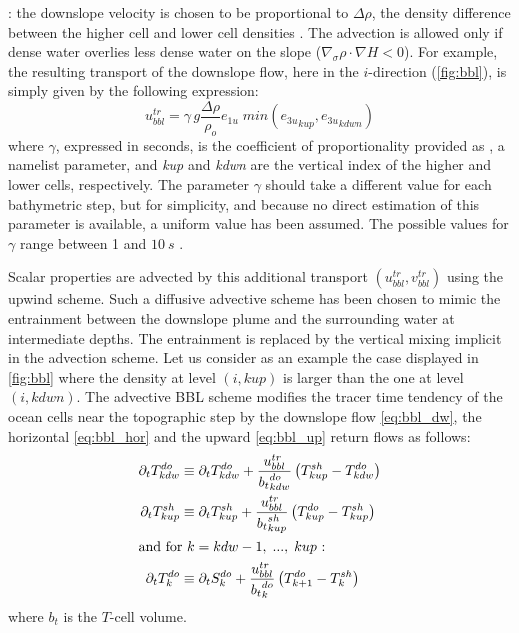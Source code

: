 \documentclass[../main/NEMO_manual]{subfiles}
\begin{document}
:
the downslope velocity is chosen to be proportional to $\Delta \rho$,
the density difference between the higher cell and lower cell densities \citep{Campin_Goosse_Tel99}.
The advection is allowed only  if dense water overlies less dense water on the slope
(\ie $\nabla_\sigma \rho  \cdot  \nabla H<0$).
For example, the resulting transport of the downslope flow, here in the $i$-direction (\autoref{fig:bbl}),
is simply given by the following expression:
\[
  u^{tr}_{bbl} = \gamma \, g \frac{\Delta \rho}{\rho_o}  e_{1u} \; min \left( {e_{3u}}_{kup},{e_{3u}}_{kdwn} \right)
\]
where $\gamma$, expressed in seconds, is the coefficient of proportionality provided as ,
a namelist parameter, and \textit{kup} and \textit{kdwn} are the vertical index of the higher and lower cells,
respectively.
The parameter $\gamma$ should take a different value for each bathymetric step, but for simplicity,
and because no direct estimation of this parameter is available, a uniform value has been assumed.
The possible values for $\gamma$ range between 1 and $10~s$ \citep{Campin_Goosse_Tel99}.

Scalar properties are advected by this additional transport $( u^{tr}_{bbl}, v^{tr}_{bbl} )$ using the upwind scheme.
Such a diffusive advective scheme has been chosen to mimic the entrainment between the downslope plume and
the surrounding water at intermediate depths.
The entrainment is replaced by the vertical mixing implicit in the advection scheme.
Let us consider as an example the case displayed in \autoref{fig:bbl} where
the density at level $(i,kup)$ is larger than the one at level $(i,kdwn)$.
The advective BBL scheme modifies the tracer time tendency of the ocean cells near the topographic step by
the downslope flow \autoref{eq:bbl_dw}, the horizontal \autoref{eq:bbl_hor} and
the upward \autoref{eq:bbl_up} return flows as follows: 
\begin{align}
  \partial_t T^{do}_{kdw} &\equiv \partial_t T^{do}_{kdw}
                            +  \frac{u^{tr}_{bbl}}{{b_t}^{do}_{kdw}}  \left( T^{sh}_{kup} - T^{do}_{kdw} \right)  \label{eq:bbl_dw} \\
  \partial_t T^{sh}_{kup} &\equiv \partial_t T^{sh}_{kup}
                            + \frac{u^{tr}_{bbl}}{{b_t}^{sh}_{kup}}   \left( T^{do}_{kup} - T^{sh}_{kup} \right)   \label{eq:bbl_hor} \\
  \intertext{and for $k =kdw-1,\;..., \; kup$ :}
  \partial_t T^{do}_{k} &\equiv \partial_t S^{do}_{k}
                          + \frac{u^{tr}_{bbl}}{{b_t}^{do}_{k}}   \left( T^{do}_{k+1} - T^{sh}_{k} \right)   \label{eq:bbl_up}
\end{align}
where $b_t$ is the $T$-cell volume. 
\end{document}
